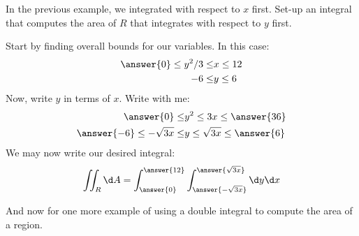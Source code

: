 \documentclass{ximera}
\begin{document}
\begin{question}
  In the previous example, we integrated with respect to $x$
  first. Set-up an integral that computes the area of $R$ that
  integrates with respect to $y$ first.
  \begin{prompt}
    Start by finding overall bounds for our variables. In this case:
    \begin{align*}
      \answer{0}\le y^2/3\le &x \le 12\\
      -6\le &y \le 6
    \end{align*}
    Now, write $y$ in terms of $x$. Write with me:
    \begin{align*}
      \answer{0}\le &y^2 \le 3x \le \answer{36}\\
      \answer{-6}\le -\sqrt{3x}\le &y \le \sqrt{3x} \le \answer{6}\\
    \end{align*}
    We may now write our desired integral:
    \[
    \iint_R \d A = \int_{\answer{0}}^{\answer{12}}\int_{\answer{-\sqrt{3x}}}^{\answer{\sqrt{3x}}} \d y \d x
    \]
  \end{prompt}
\end{question}

And now for one more example of using a double integral to compute the
area of a region.
\end{document}
